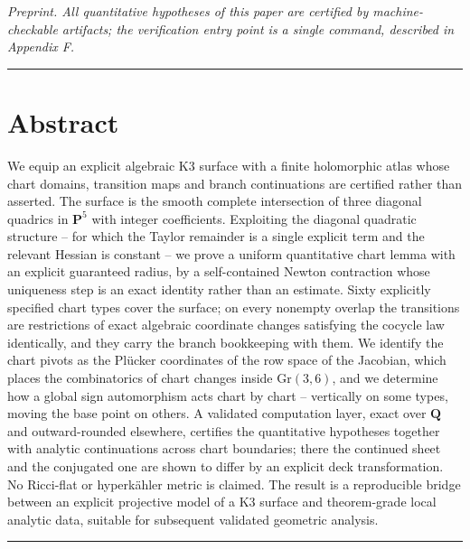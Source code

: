\emph{Preprint. All quantitative hypotheses of this paper are certified by machine-checkable artifacts; the verification entry point is a single command, described in Appendix F.}

\begin{center}\rule{\linewidth}{0.5pt}\end{center}

\section{Abstract}\label{abstract}

We equip an explicit algebraic K3 surface with a finite holomorphic atlas whose chart domains, transition maps and branch continuations are certified rather than asserted. The surface is the smooth complete intersection of three diagonal quadrics in \(\mathbf{P}^5\) with integer coefficients. Exploiting the diagonal quadratic structure -- for which the Taylor remainder is a single explicit term and the relevant Hessian is constant -- we prove a uniform quantitative chart lemma with an explicit guaranteed radius, by a self-contained Newton contraction whose uniqueness step is an exact identity rather than an estimate. Sixty explicitly specified chart types cover the surface; on every nonempty overlap the transitions are restrictions of exact algebraic coordinate changes satisfying the cocycle law identically, and they carry the branch bookkeeping with them. We identify the chart pivots as the Plücker coordinates of the row space of the Jacobian, which places the combinatorics of chart changes inside \(\mathrm{Gr}(3,6)\), and we determine how a global sign automorphism acts chart by chart -- vertically on some types, moving the base point on others. A validated computation layer, exact over \(\mathbf{Q}\) and outward-rounded elsewhere, certifies the quantitative hypotheses together with analytic continuations across chart boundaries; there the continued sheet and the conjugated one are shown to differ by an explicit deck transformation. No Ricci-flat or hyperkähler metric is claimed. The result is a reproducible bridge between an explicit projective model of a K3 surface and theorem-grade local analytic data, suitable for subsequent validated geometric analysis.

\begin{center}\rule{\linewidth}{0.5pt}\end{center}

\newpage
\begingroup
\setlength{\parskip}{0pt}
\tableofcontents
\endgroup
\newpage
